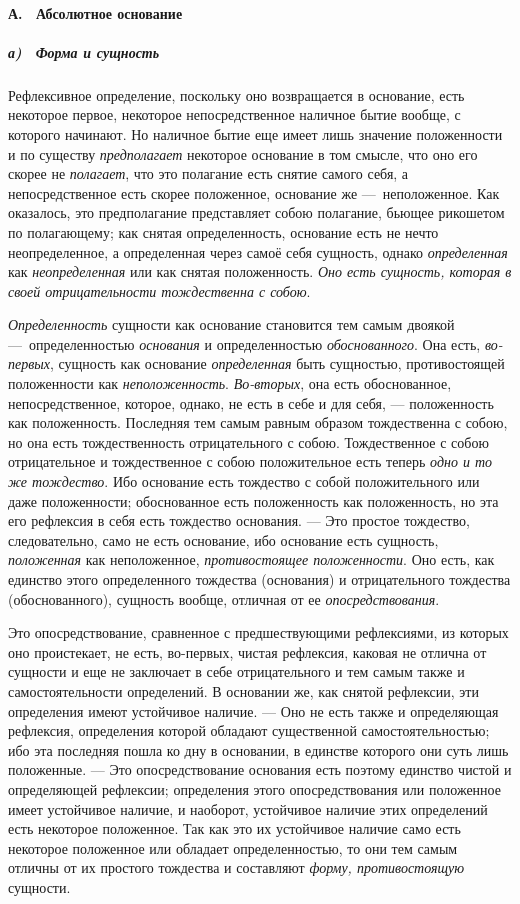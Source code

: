 \paragraph[А. \ Абсолютное основание]{А. \ Абсолютное основание}
\subparagraph[а) \ Форма и сущность]{а) \ Форма и сущность}
Рефлексивное определение, поскольку оно
возвращается в основание, есть некоторое первое, некоторое непосредственное
наличное бытие вообще, с которого начинают. Но наличное бытие еще имеет
лишь значение положенности и по существу
{\em предполагает} некоторое основание в том смысле,
что оно его скорее не {\em полагает}, что это полагание
есть снятие самого себя, а непосредственное есть скорее положенное,
основание же —~неположенное. Как оказалось, это предполагание представляет
собою полагание, бьющее рикошетом по полагающему; как снятая
определенность, основание есть не нечто неопределенное, а определенная
через самоё себя сущность, однако {\em определенная}
как {\em неопределенная} или как снятая положенность.
{\em Оно есть сущность, которая в своей отрицательности
тождественна с собою}.

{\em Определенность} сущности как основание становится
тем самым двоякой —~определенностью {\em основания} и
определенностью {\em обоснованного}. Она есть,
{\em во-первых}, сущность как основание
{\em определенная} быть сущностью, противостоящей
положенности как {\em неположенность}.
{\em Во-вторых}, она есть обоснованное,
непосредственное, которое, однако, не есть в себе и для себя, —
положенность как положенность. Последняя тем самым равным образом
тождественна с собою, но она есть тождественность отрицательного с собою.
Тождественное с собою отрицательное и тождественное с собою положительное
есть теперь {\em одно и то же тождество}. Ибо основание
есть тождество с собой положительного или даже положенности; обоснованное
есть положенность как положенность, но эта его рефлексия в себя есть
тождество основания. — Это простое тождество, следовательно, само не есть
основание, ибо основание есть сущность,
{\em положенная} как неположенное,
{\em противостоящее положенности}. Оно есть, как
единство этого определенного тождества (основания) и отрицательного
тождества (обоснованного), сущность вообще, отличная от ее
{\em опосредствования}.

Это опосредствование, сравненное с предшествующими рефлексиями, из которых
оно проистекает, не есть, во-первых, чистая рефлексия, каковая не отлична
от сущности и еще не заключает в себе отрицательного и тем самым также и
самостоятельности определений. В основании же, как снятой рефлексии, эти
определения имеют устойчивое наличие. — Оно не есть также и определяющая
рефлексия, определения которой обладают существенной самостоятельностью;
ибо эта последняя пошла ко дну в основании, в единстве которого они суть
лишь положенные. — Это опосредствование основания есть поэтому единство
чистой и определяющей рефлексии; определения этого опосредствования или
положенное имеет устойчивое наличие, и наоборот, устойчивое наличие этих
определений есть некоторое положенное. Так как это их устойчивое наличие
само есть некоторое положенное или обладает определенностью, то они тем
самым отличны от их простого тождества и составляют
{\em форму, противостоящую} сущности.

